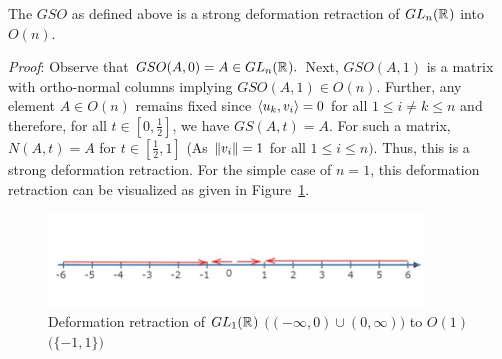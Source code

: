 \begin{theorem}
The $GSO$ as defined above is a strong deformation retraction of $GL_n(\mathbb{R}^{})$ into $O(n)$.
\end{theorem}
\emph{Proof}: Observe that $GSO(A,0) = A \in GL_n(\mathbb{R}^{}).$ Next, $GSO(A,1)$ is a matrix with ortho-normal columns implying $GSO(A,1) \in O(n)$. Further, any element $A \in O(n)$ remains fixed since $\langle u_k, v_i \rangle = 0$ for all $1 \leq i \neq k \leq n$ and therefore, for all $t \in [0,\frac{1}{2}]$, we have $GS(A, t)=A$. For such a matrix,$N(A, t)=A$ for $t \in [\frac{1}{2},1]$ (As ${\left\lVert v_i \right\rVert} = 1$ for all $1 \leq i \leq n)$. Thus, this is a strong deformation retraction. For the simple case of $n=1$, this deformation retraction can be visualized as given in Figure~\ref{fig:deform-retract}.
\begin{figure}[t]
  \centering
\includegraphics[width=10cm]{RealLine-deformation-retract.png}
\caption{Deformation retraction of $GL_1(\mathbb{R}^{})$ $\bigl((-\infty, 0)\cup (0, \infty)\bigr)$ to $O(1)$ $\bigl(\{-1, 1\}\bigr)$}
  \label{fig:deform-retract}
\end{figure}
